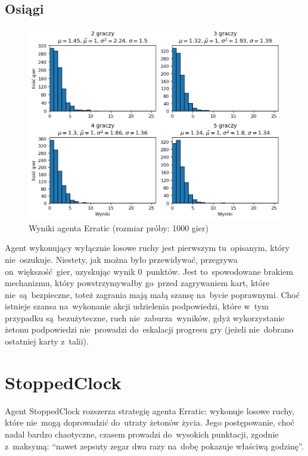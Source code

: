 \documentclass[declaration,shortabstract,inz]{iithesis}
\begin{document}
\subsection*{Osiągi}

\begin{figure}[H]
	\centering
	\captionsetup{format=hang}
	\includegraphics[width=\textwidth,height=\textheight,keepaspectratio]{Erratic.png}
	\caption[Caption]{Wyniki agenta Erratic (rozmiar próby: 1000 gier)}
	\label{fig:Erratic}
\end{figure}

Agent wykonujący wyłącznie losowe ruchy jest pierwszym tu~opisanym, który nie~oszukuje. Niestety, jak można było przewidywać, przegrywa on~większość gier, uzyskując wynik 0~punktów. Jest to~spowodowane brakiem mechanizmu, który powstrzymywałby go~przed zagrywaniem kart, które nie~są~bezpieczne, toteż zagrania mają małą szansę na~bycie poprawnymi. Choć istnieje szansa na~wykonanie akcji udzielenia podpowiedzi, które w~tym przypadku są~bezużyteczne, ruch nie~zaburza wyników, gdyż wykorzystanie żetonu podpowiedzi nie~prowadzi do~eskalacji progresu gry (jeżeli nie~dobrano ostatniej karty z~talii).

\section{StoppedClock}

Agent StoppedClock rozszerza strategię agenta Erratic: wykonuje losowe ruchy, które nie~mogą doprowadzić do~utraty żetonów życia. Jego postępowanie, choć nadal bardzo chaotyczne, czasem prowadzi do~wysokich punktacji, zgodnie z~maksymą: ``nawet zepsuty zegar dwa razy na~dobę pokazuje właściwą godzinę''.
\end{document}
